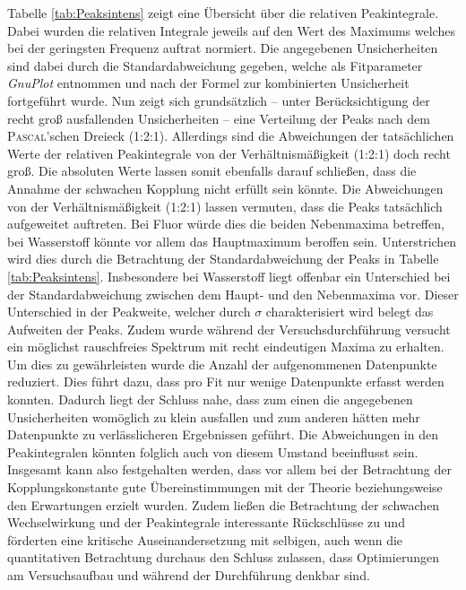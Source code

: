 Tabelle \ref{tab:Peaksintens} zeigt eine Übersicht über die relativen Peakintegrale.
Dabei wurden die relativen Integrale jeweils auf den Wert des Maximums welches bei der geringsten Frequenz auftrat normiert.
Die angegebenen Unsicherheiten sind dabei durch die Standardabweichung gegeben, welche als Fitparameter \textit{GnuPlot} entnommen und nach der Formel zur kombinierten Unsicherheit fortgeführt wurde.
Nun zeigt sich grundsätzlich -- unter Berücksichtigung der recht groß ausfallenden Unsicherheiten -- eine Verteilung der Peaks nach dem \textsc{Pascal}'schen Dreieck (1:2:1).
Allerdings sind die Abweichungen der tatsächlichen Werte der relativen Peakintegrale von der Verhältnismäßigkeit (1:2:1) doch recht groß.
Die absoluten Werte lassen somit ebenfalls darauf schließen, dass die Annahme der schwachen Kopplung nicht erfüllt sein könnte.
Die Abweichungen von der Verhältnismäßigkeit (1:2:1) lassen vermuten, dass die Peaks tatsächlich aufgeweitet auftreten.
Bei Fluor würde dies die beiden Nebenmaxima betreffen, bei Wasserstoff könnte vor allem das Hauptmaximum beroffen sein.
Unterstrichen wird dies durch die Betrachtung der Standardabweichung der Peaks in Tabelle \ref{tab:Peaksintens}. 
Insbesondere bei Wasserstoff liegt offenbar ein Unterschied bei der Standardabweichung zwischen dem Haupt- und den Nebenmaxima vor.
Dieser Unterschied in der Peakweite, welcher durch $\sigma$ charakterisiert wird belegt das Aufweiten der Peaks.
Zudem wurde während der Versuchsdurchführung versucht ein möglichst rauschfreies Spektrum mit recht eindeutigen Maxima zu erhalten.
Um dies zu gewährleisten wurde die Anzahl der aufgenommenen Datenpunkte reduziert.
Dies führt dazu, dass pro Fit nur wenige Datenpunkte erfasst werden konnten.
Dadurch liegt der Schluss nahe, dass zum einen die angegebenen Unsicherheiten womöglich zu klein ausfallen und zum anderen hätten mehr Datenpunkte zu verlässlicheren Ergebnissen geführt.
Die Abweichungen in den Peakintegralen könnten folglich auch von diesem Umstand beeinflusst sein.
Insgesamt kann also festgehalten werden, dass vor allem bei der Betrachtung der Kopplungskonstante gute Übereinstimmungen mit der Theorie beziehungsweise den Erwartungen erzielt wurden.
Zudem ließen die Betrachtung der schwachen Wechselwirkung und der Peakintegrale interessante Rückschlüsse zu und förderten eine kritische Auseinandersetzung mit selbigen, auch wenn die quantitativen Betrachtung durchaus den Schluss zulassen, dass Optimierungen am Versuchsaufbau und während der Durchführung denkbar sind.



